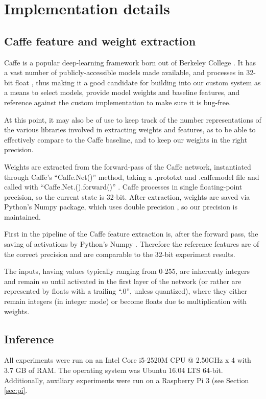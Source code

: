 \section{Implementation details}
\subsection{Caffe feature and weight extraction}
\label{sec:caffe}
Caffe is a popular deep-learning framework born out of Berkeley College \cite{caffe}. It has a vast number of publicly-accessible models made available, and processes in 32-bit float \cite{caffe}, thus making it a good candidate for building into our custom system as a means to select models, provide model weights and baseline features, and reference against the custom implementation to make sure it is bug-free.

At this point, it may also be of use to keep track of the number representations of the various libraries involved in extracting weights and features, as to be able to effectively compare to the Caffe baseline, and to keep our weights in the right precision.

Weights are extracted from the forward-pass of the Caffe network, instantiated through Caffe's ``Caffe.Net()'' method, taking a .prototxt and .caffemodel file and called with ``Caffe.Net.().forward()'' \cite{caffe}. Caffe processes in single floating-point precision, so the current state is 32-bit. After extraction, weights are saved via Python's Numpy package, which uses double precision \cite{scipy}, so our precision is maintained.

First in the pipeline of the Caffe feature extraction is, after the forward pass, the saving of activations by Python's Numpy \cite{scipy}. Therefore the reference features are of the correct precision and are comparable to the 32-bit experiment results.

The inputs, having values typically ranging from 0-255, are inherently integers and remain so until activated in the first layer of the network (or rather are represented by floats with a trailing ``.0'', unless quantized), where they either remain integers (in integer mode) or become floats due to multiplication with weights.

\subsection{Inference}
All experiments were run on an Intel Core i5-2520M CPU @ 2.50GHz x 4 with 3.7 GB of RAM. The operating system was Ubuntu 16.04 LTS 64-bit. Additionally, auxiliary experiments were run on a Raspberry Pi 3 (see Section \ref{sec:pi}.

